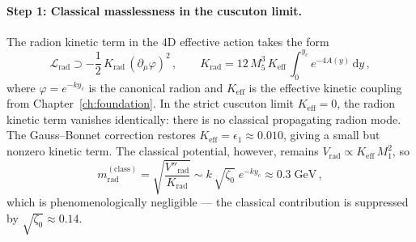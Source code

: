 \paragraph{Step 1: Classical masslessness in the cuscuton limit.}
The radion kinetic term in the 4D effective action takes the form
\begin{equation}
  \mathcal{L}_{\mathrm{rad}} \supset -\frac{1}{2}\,K_{\mathrm{rad}}\,(\partial_\mu \varphi)^2\,, \qquad
  K_{\mathrm{rad}} = 12\,M_5^3\,K_{\mathrm{eff}}\,\int_0^{y_c} e^{-4A(y)}\,\mathrm{d}y\,,
\end{equation}
where $\varphi = e^{-ky_c}$ is the canonical radion and $K_{\mathrm{eff}}$ is the effective kinetic coupling from Chapter~\ref{ch:foundation}.  In the strict cuscuton limit $K_{\mathrm{eff}} = 0$, the radion kinetic term vanishes identically: there is no classical propagating radion mode.  The Gauss--Bonnet correction restores $K_{\mathrm{eff}} = \epsilon_1 \approx 0.010$, giving a small but nonzero kinetic term.  The classical potential, however, remains $V_{\mathrm{rad}} \propto K_{\mathrm{eff}}\,M_1^2$, so
\begin{equation}
  m_{\mathrm{rad}}^{(\mathrm{class})} = \sqrt{\frac{V''_{\mathrm{rad}}}{K_{\mathrm{rad}}}} \sim k\,\sqrt{\zeta_0}\;e^{-ky_c} \approx 0.3\;\mathrm{GeV}\,,
\end{equation}
which is phenomenologically negligible --- the classical contribution is suppressed by $\sqrt{\zeta_0} \approx 0.14$.

